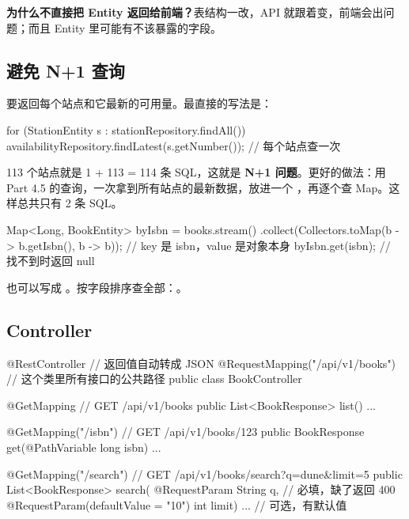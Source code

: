 \textbf{为什么不直接把 Entity 返回给前端？}表结构一改，API 就跟着变，前端会出问题；而且 Entity 里可能有不该暴露的字段。

\subsection{避免 N+1 查询}

 要返回每个站点和它最新的可用量。最直接的写法是：

\begin{java}
for (StationEntity s : stationRepository.findAll()) {
    availabilityRepository.findLatest(s.getNumber());   // 每个站点查一次
}
\end{java}

113 个站点就是 1 + 113 = 114 条 SQL，这就是 \textbf{N+1 问题}。更好的做法：用 Part 4.5 的查询，一次拿到所有站点的最新数据，放进一个 ，再逐个查 Map。这样总共只有 2 条 SQL。

\begin{java}
Map<Long, BookEntity> byIsbn = books.stream()
        .collect(Collectors.toMap(b -> b.getIsbn(), b -> b));  // key 是 isbn，value 是对象本身
byIsbn.get(isbn);                                             // 找不到时返回 null
\end{java}

 也可以写成 。按字段排序查全部：。

\subsection{Controller}

\begin{java}
@RestController                          // 返回值自动转成 JSON
@RequestMapping("/api/v1/books")         // 这个类里所有接口的公共路径
public class BookController {

    @GetMapping                          // GET /api/v1/books
    public List<BookResponse> list() { ... }

    @GetMapping("/{isbn}")               // GET /api/v1/books/123
    public BookResponse get(@PathVariable long isbn) { ... }

    @GetMapping("/search")               // GET /api/v1/books/search?q=dune&limit=5
    public List<BookResponse> search(
            @RequestParam String q,                                // 必填，缺了返回 400
            @RequestParam(defaultValue = "10") int limit) { ... }  // 可选，有默认值
}
\end{java}

